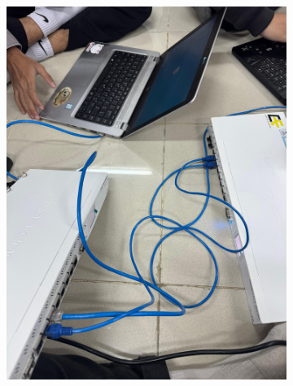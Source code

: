 \begin{figure}[H]
	\begin{subfigure}[b]{0.4\linewidth}
		\centering
		\includegraphics[width=\linewidth]{P2/img/dokum (5).jpg}
	\end{subfigure}
	\begin{subfigure}[b]{0.4\linewidth}
		\centering

\end{subfigure}
\end{figure}
